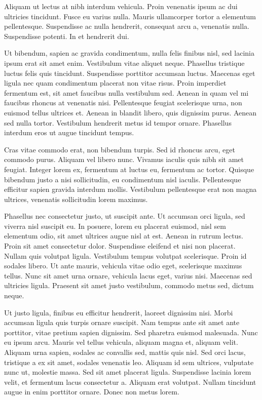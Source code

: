 \documentclass[11pt]{article}
\begin{document}
    Aliquam ut lectus at nibh interdum vehicula. Proin venenatis ipsum ac dui ultricies tincidunt. Fusce eu varius nulla. Mauris ullamcorper tortor a elementum pellentesque. Suspendisse ac nulla hendrerit, consequat arcu a, venenatis nulla. Suspendisse potenti. In et hendrerit dui.

    Ut bibendum, sapien ac gravida condimentum, nulla felis finibus nisl, sed lacinia ipsum erat sit amet enim. Vestibulum vitae aliquet neque. Phasellus tristique luctus felis quis tincidunt. Suspendisse porttitor accumsan luctus. Maecenas eget ligula nec quam condimentum placerat non vitae risus. Proin imperdiet fermentum est, sit amet faucibus nulla vestibulum sed. Aenean in quam vel mi faucibus rhoncus at venenatis nisi. Pellentesque feugiat scelerisque urna, non euismod tellus ultrices et. Aenean in blandit libero, quis dignissim purus. Aenean sed nulla tortor. Vestibulum hendrerit metus id tempor ornare. Phasellus interdum eros ut augue tincidunt tempus.

    Cras vitae commodo erat, non bibendum turpis. Sed id rhoncus arcu, eget commodo purus. Aliquam vel libero nunc. Vivamus iaculis quis nibh sit amet feugiat. Integer lorem ex, fermentum at luctus eu, fermentum ac tortor. Quisque bibendum justo a nisi sollicitudin, eu condimentum nisl iaculis. Pellentesque efficitur sapien gravida interdum mollis. Vestibulum pellentesque erat non magna ultrices, venenatis sollicitudin lorem maximus.

    Phasellus nec consectetur justo, ut suscipit ante. Ut accumsan orci ligula, sed viverra nisl suscipit eu. In posuere, lorem eu placerat euismod, nisl sem elementum odio, sit amet ultrices augue nisl at est. Aenean in rutrum lectus. Proin sit amet consectetur dolor. Suspendisse eleifend et nisi non placerat. Nullam quis volutpat ligula. Vestibulum tempus volutpat scelerisque. Proin id sodales libero. Ut ante mauris, vehicula vitae odio eget, scelerisque maximus tellus. Nunc sit amet urna ornare, vehicula lacus eget, varius nisi. Maecenas sed ultricies ligula. Praesent sit amet justo vestibulum, commodo metus sed, dictum neque.

    Ut justo ligula, finibus eu efficitur hendrerit, laoreet dignissim nisi. Morbi accumsan ligula quis turpis ornare suscipit. Nam tempus ante sit amet ante porttitor, vitae pretium sapien dignissim. Sed pharetra euismod malesuada. Nunc eu ipsum arcu. Mauris vel tellus vehicula, aliquam magna et, aliquam velit. Aliquam urna sapien, sodales ac convallis sed, mattis quis nisl. Sed orci lacus, tristique a ex sit amet, sodales venenatis leo. Aliquam id sem ultrices, vulputate nunc ut, molestie massa. Sed sit amet placerat ligula. Suspendisse lacinia lorem velit, et fermentum lacus consectetur a. Aliquam erat volutpat. Nullam tincidunt augue in enim porttitor ornare. Donec non metus lorem.
\end{document}
